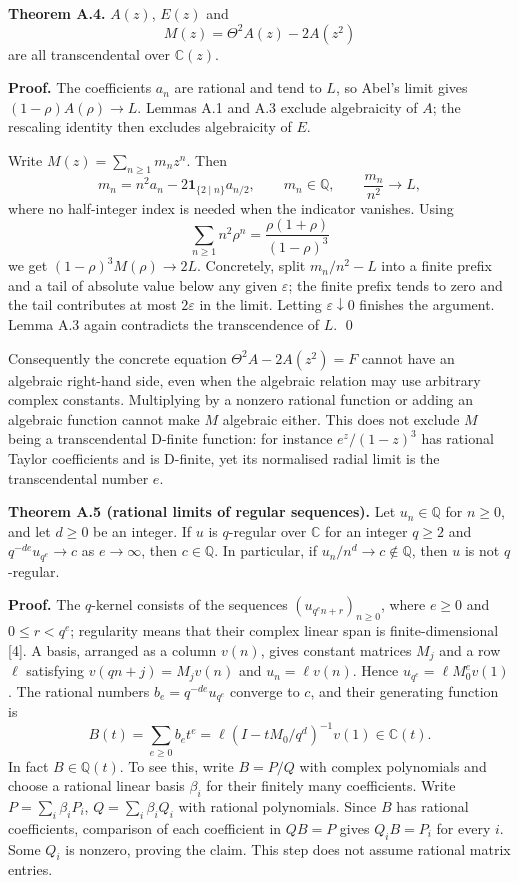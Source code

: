 \documentclass[11pt]{article}
\begin{document}
\textbf{Theorem A.4.} $A(z)$, $E(z)$ and
\[
M(z)=\Theta^2A(z)-2A(z^2)
\]
are all transcendental over $\mathbb C(z)$.

\textbf{Proof.} The coefficients $a_n$ are rational and tend to $L$, so Abel's limit gives $(1-\rho)A(\rho)\to L$. Lemmas A.1 and A.3 exclude algebraicity of $A$; the rescaling identity then excludes algebraicity of $E$.

Write $M(z)=\sum_{n\ge1}m_nz^n$. Then
\[
m_n=n^2a_n-2\mathbf1_{\{2\mid n\}}a_{n/2},\qquad m_n\in\mathbb Q,\qquad \frac{m_n}{n^2}\longrightarrow L,
\]
where no half-integer index is needed when the indicator vanishes. Using
\[
\sum_{n\ge1}n^2\rho^n=\frac{\rho(1+\rho)}{(1-\rho)^3}
\]
we get $(1-\rho)^3M(\rho)\to2L$. Concretely, split $m_n/n^2-L$ into a finite prefix and a tail of absolute value below any given $\varepsilon$; the finite prefix tends to zero and the tail contributes at most $2\varepsilon$ in the limit. Letting $\varepsilon\downarrow0$ finishes the argument. Lemma A.3 again contradicts the transcendence of $L$. \qed

Consequently the concrete equation $\Theta^2A-2A(z^2)=F$ cannot have an algebraic right-hand side, even when the algebraic relation may use arbitrary complex constants. Multiplying by a nonzero rational function or adding an algebraic function cannot make $M$ algebraic either. This does not exclude $M$ being a transcendental D-finite function: for instance $e^z/(1-z)^3$ has rational Taylor coefficients and is D-finite, yet its normalised radial limit is the transcendental number $e$.

\textbf{Theorem A.5 (rational limits of regular sequences).} Let $u_n\in\mathbb Q$ for $n\ge0$, and let $d\ge0$ be an integer. If $u$ is $q$-regular over $\mathbb C$ for an integer $q\ge2$ and $q^{-de}u_{q^e}\to c$ as $e\to\infty$, then $c\in\mathbb Q$. In particular, if $u_n/n^d\to c\notin\mathbb Q$, then $u$ is not $q$-regular.

\textbf{Proof.} The $q$-kernel consists of the sequences $(u_{q^e n+r})_{n\ge0}$, where $e\ge0$ and $0\le r<q^e$; regularity means that their complex linear span is finite-dimensional [4]. A basis, arranged as a column $v(n)$, gives constant matrices $M_j$ and a row $\ell$ satisfying $v(qn+j)=M_jv(n)$ and $u_n=\ell v(n)$. Hence $u_{q^e}=\ell M_0^ev(1)$. The rational numbers $b_e=q^{-de}u_{q^e}$ converge to $c$, and their generating function is
\[
 B(t)=\sum_{e\ge0}b_et^e=\ell(I-tM_0/q^d)^{-1}v(1)\in\mathbb C(t).
\]
In fact $B\in\mathbb Q(t)$. To see this, write $B=P/Q$ with complex polynomials and choose a rational linear basis $\beta_i$ for their finitely many coefficients. Write $P=\sum_i\beta_iP_i$, $Q=\sum_i\beta_iQ_i$ with rational polynomials. Since $B$ has rational coefficients, comparison of each coefficient in $QB=P$ gives $Q_iB=P_i$ for every $i$. Some $Q_i$ is nonzero, proving the claim. This step does not assume rational matrix entries.
\end{document}

